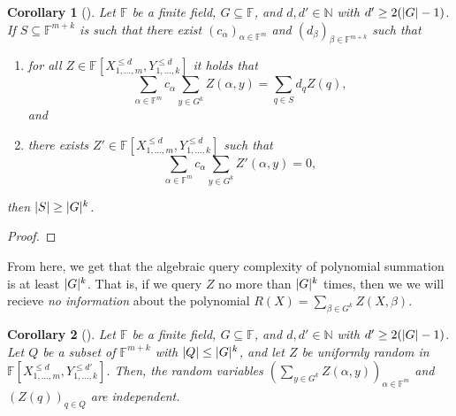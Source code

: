 \documentclass[english,12pt]{reedthesis}
\theoremstyle{plain}
\newtheorem{cor}[cor]{Corollary}
\theoremstyle{definition}
\theoremstyle{remark}
\DeclarePairedDelimiter{\abs}{\lvert}{\rvert}
\begin{document}
\begin{cor}[{\cite[Corollary 12.2]{CFGS22}}]\label{cor:sum-c-z}
  Let $\mathbb{F}$ be a finite field, $G \subseteq \mathbb{F}$, and $d, d' \in \mathbb{N}$ with
  $d' \ge 2(\abs{G} - 1)$. If $S \subseteq \mathbb{F}^{m+k}$ is such that there exist
  $(c_{\alpha})_{\alpha \in \mathbb{F}^{m}}$ and $(d_{\beta})_{\beta \in \mathbb{F}^{m+k}}$ such that
  \begin{enumerate}
    \item for all $Z \in \mathbb{F}[X_{1, \ldots, m}^{\le d}, Y_{1, \ldots, k}^{\le d}]$ it
          holds that
          \begin{equation}\label{eqn:sum-c-z-d-z}
            \sum_{\alpha \in \mathbb{F}^{m}}c_{\alpha}\sum_{y \in G^{k}}Z(\alpha, y) = \sum_{q \in S}d_{q}Z(q),
          \end{equation}
          and
    \item there exists $Z' \in \mathbb{F}[X_{1, \ldots, m}^{\le d}, Y_{1, \ldots, k}^{\le d}]$
          such that
          \begin{equation}\label{eqn:sum-c-z-zero}
            \sum_{\alpha \in \mathbb{F}^{m}}c_{\alpha}\sum_{y \in G^{k}}Z'(\alpha, y) = 0,
          \end{equation}
  \end{enumerate}
  then $\abs{S} \ge \abs{G}^{k}$.
\end{cor}

\begin{proof}
\end{proof}

From here, we get that the algebraic query complexity of polynomial summation is
at least $\abs{G}^{k}$. That is, if we query $Z$ no more than $\abs{G}^{k}$
times, then we we will recieve \emph{no information} about the polynomial
$R(X) = \sum_{\beta \in G^{k}}Z(X, \beta)$.

\begin{cor}[{\cite[Corollary 12.3]{CFGS22}}]\label{cor:indep-ensemble}
  Let $\mathbb{F}$ be a finite field, $G \subseteq \mathbb{F}$, and $d, d' \in \mathbb{N}$ with
  $d' \ge 2(\abs{G} - 1)$. Let $Q$ be a subset of $\mathbb{F}^{m+k}$ with
  $\abs{Q} \le \abs{G}^{k}$, and let $Z$ be uniformly random in
  $\mathbb{F}[X_{1, \ldots, m}^{\le d}, Y_{1, \ldots, k}^{\le d'}]$. Then, the random
  variables $(\sum_{y \in G^{k}}Z(\alpha, y))_{\alpha \in \mathbb{F}^{m}}$ and $(Z(q))_{q \in Q}$
  are independent.
\end{cor}
\end{document}
